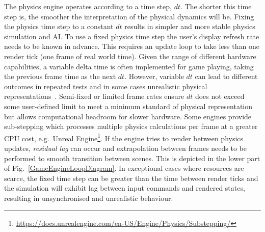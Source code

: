 \documentclass[letterpaper, 10 pt, journal, twoside]{IEEEtran}
\begin{document}
The physics engine operates according to a time step, $dt$. %
The shorter this time step is, the smoother the interpretation of the physical dynamics will be. %
%
Fixing the physics time step to a constant $dt$ results in simpler and more stable physics simulation and AI. 
%
To use a fixed physics time step the user's display refresh rate needs to be known in advance. This requires an update loop to take less than one render tick (one frame of real world time). Given the range of different hardware capabilities, a variable delta time is often implemented for game playing, taking the previous frame time as the next $dt$. However, variable $dt$ can lead to different outcomes in repeated tests and in some cases unrealistic physical representations~\cite{gaffer}. 
%
Semi-fixed or limited frame rates ensure $dt$ does not exceed some user-defined limit to meet a minimum standard of physical representation but allows computational headroom for slower hardware. Some engines provide sub-stepping which processes multiple physics calculations per frame at a greater CPU cost, e.g.\ Unreal Engine\footnote{\url{https://docs.unrealengine.com/en-US/Engine/Physics/Substepping/}}. 
%
If the engine tries to render between physics updates, \textit{residual lag} can occur and extrapolation between frames needs to be performed to smooth transition between scenes. This is depicted in the lower part of Fig.~\ref{GameEngineLoopDiagram}. \cite{GameEngineArchBook}\cite{GameProgPatternsBook}
%
In exceptional cases where resources are scarce, the fixed time step can be greater than the time between render ticks %
and the simulation will exhibit lag between input commands and rendered states, resulting in unsynchronised and unrealistic behaviour.

\end{document}
